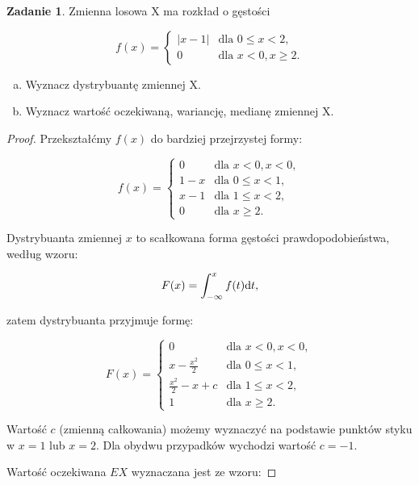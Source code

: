 \documentclass[11pt]{article}
\theoremstyle{definition}
\newtheorem{zadanie}{Zadanie}
\numberwithin{zadanie}{section}
\begin{document}
\begin{zadanie}
    Zmienna losowa X ma rozkład o gęstości

    \[
        f(x) = \left\{\begin{array}{lr}
            |x-1| & \text{dla } 0\leq x < 2, \\
            0     & \text{dla }x<0, x\geq 2.
        \end{array}\right.
    \]

    \begin{enumerate}[a)]
        \item Wyznacz dystrybuantę zmiennej X.
        \item Wyznacz wartość oczekiwaną, wariancję, medianę zmiennej X.
    \end{enumerate}
\end{zadanie}
\begin{proof}
    Przekształćmy $f(x)$ do bardziej przejrzystej formy:

    \[
        f(x) = \left\{\begin{array}{lr}
            0   & \text{dla }x<0, x< 0,    \\
            1-x & \text{dla } 0\leq x < 1, \\
            x-1 & \text{dla } 1\leq x < 2, \\
            0   & \text{dla } x\geq 2.
        \end{array}\right.
    \]

    Dystrybuanta zmiennej $x$ to scałkowana forma gęstości prawdopodobieństwa, według wzoru:

    $$F(x) = \int_{-\infty}^xf(t)\text dt,$$

    zatem dystrybuanta przyjmuje formę:

    \[
        F(x) = \left\{\begin{array}{lr}
            0               & \text{dla }x<0, x< 0,    \\
            x-\frac{x^2}2   & \text{dla } 0\leq x < 1, \\
            \frac{x^2}2-x+c & \text{dla } 1\leq x < 2, \\
            1               & \text{dla } x\geq 2.
        \end{array}\right.
    \]

    Wartość $c$ (zmienną całkowania) możemy wyznaczyć na podstawie punktów styku w $x=1$ lub $x=2$. Dla obydwu przypadków wychodzi wartość $c=-1$.

    Wartość oczekiwana $EX$ wyznaczana jest ze wzoru:


\end{proof}
\end{document}
